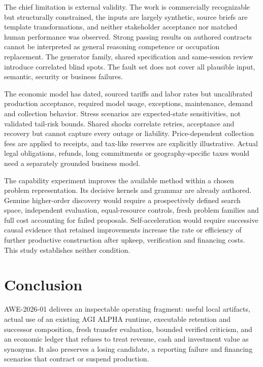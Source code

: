 The chief limitation is external validity. The work is commercially recognizable but structurally constrained, the inputs are largely synthetic, source briefs are template transformations, and neither stakeholder acceptance nor matched human performance was observed. Strong passing results on authored contracts cannot be interpreted as general reasoning competence or occupation replacement. The generator family, shared specification and same-session review introduce correlated blind spots. The fault set does not cover all plausible input, semantic, security or business failures.

The economic model has dated, sourced tariffs and labor rates but uncalibrated production acceptance, required model usage, exceptions, maintenance, demand and collection behavior. Stress scenarios are expected-state sensitivities, not validated tail-risk bounds. Shared shocks correlate retries, acceptance and recovery but cannot capture every outage or liability. Price-dependent collection fees are applied to receipts, and tax-like reserves are explicitly illustrative. Actual legal obligations, refunds, long commitments or geography-specific taxes would need a separately grounded business model.

The capability experiment improves the available method within a chosen problem representation. Its decisive kernels and grammar are already authored. Genuine higher-order discovery would require a prospectively defined search space, independent evaluation, equal-resource controls, fresh problem families and full cost accounting for failed proposals. Self-acceleration would require successive causal evidence that retained improvements increase the rate or efficiency of further productive construction after upkeep, verification and financing costs. This study establishes neither condition.

\section{Conclusion}

AWE-2026-01 delivers an inspectable operating fragment: useful local artifacts, actual use of an existing AGI ALPHA runtime, executable retention and successor composition, fresh transfer evaluation, bounded verified criticism, and an economic ledger that refuses to treat revenue, cash and investment value as synonyms. It also preserves a losing candidate, a reporting failure and financing scenarios that contract or suspend production.

